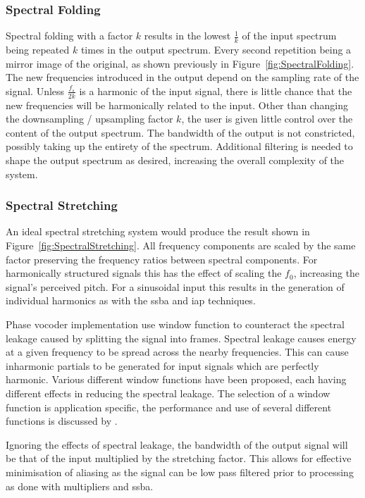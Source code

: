 		\subsubsection*{Spectral Folding}
			Spectral folding with a factor $k$ results in the lowest $\frac{1}{k}$ of the input spectrum being
			repeated $k$ times in the output spectrum. Every second repetition being a mirror image of the
			original, as shown previously in Figure~\ref{fig:SpectralFolding}. The new frequencies introduced
			in the output depend on the sampling rate of the signal. Unless $\frac{f_{s}}{2k}$ is a harmonic of
			the input signal, there is little chance that the new frequencies will be harmonically related to
			the input. Other than changing the downsampling / upsampling factor $k$, the user is given little
			control over the content of the output spectrum.  The bandwidth of the output is not constricted,
			possibly taking up the entirety of the spectrum.  Additional filtering is needed to shape the
			output spectrum as desired, increasing the overall complexity of the system.

		\subsubsection*{Spectral Stretching}
			An ideal spectral stretching system would produce the result shown in
			Figure~\ref{fig:SpectralStretching}. All frequency components are scaled by the same factor
			preserving the frequency ratios between spectral components. For harmonically structured signals
			this has the effect of scaling the $f_{0}$, increasing the signal's perceived pitch. For a
			sinusoidal input this results in the generation of individual harmonics as with the \acrshort{ssba}
			and \acrshort{iap} techniques.
			
			Phase vocoder implementation use window function to counteract the spectral leakage caused by
			splitting the signal into frames. Spectral leakage causes energy at a given frequency to be spread
			across the nearby frequencies. This can cause inharmonic partials to be generated for input signals
			which are perfectly harmonic. Various different window functions have been proposed, each having
			different effects in reducing the spectral leakage. The selection of a window function is
			application specific, the performance and use of several different functions is discussed by
			\citet{harris1978on}.
			
			Ignoring the effects of spectral leakage, the bandwidth of the output signal will be that of the
			input multiplied by the stretching factor. This allows for effective minimisation of aliasing as
			the signal can be low pass filtered prior to processing as done with multipliers and
			\acrshort{ssba}.
		
